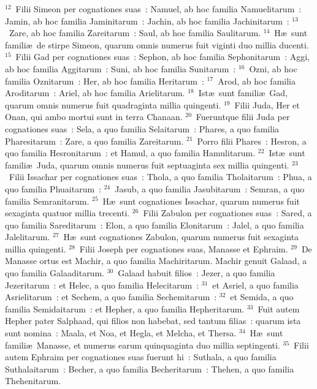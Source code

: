 ${}^{12}$~Filii Simeon per cognationes suas~: Namuel, ab hoc familia Namuelitarum~: Jamin, ab hoc familia Jaminitarum~: Jachin, ab hoc familia Jachinitarum~:
${}^{13}$~Zare, ab hoc familia Zareitarum~: Saul, ab hoc familia Saulitarum.
${}^{14}$~H\ae\ sunt famili\ae\ de stirpe Simeon, quarum omnis numerus fuit viginti duo millia ducenti.
${}^{15}$~Filii Gad per cognationes suas~: Sephon, ab hoc familia Sephonitarum~: Aggi, ab hoc familia Aggitarum~: Suni, ab hoc familia Sunitarum~:
${}^{16}$~Ozni, ab hoc familia Oznitarum~: Her, ab hoc familia Heritarum~:
${}^{17}$~Arod, ab hoc familia Aroditarum~: Ariel, ab hoc familia Arielitarum.
${}^{18}$~Ist\ae\ sunt famili\ae\ Gad, quarum omnis numerus fuit quadraginta millia quingenti.
${}^{19}$~Filii Juda, Her et Onan, qui ambo mortui sunt in terra Chanaan.
${}^{20}$~Fueruntque filii Juda per cognationes suas~: Sela, a quo familia Selaitarum~: Phares, a quo familia Pharesitarum~: Zare, a quo familia Zareitarum.
${}^{21}$~Porro filii Phares~: Hesron, a quo familia Hesronitarum~: et Hamul, a quo familia Hamulitarum.
${}^{22}$~Ist\ae\ sunt famili\ae\ Juda, quarum omnis numerus fuit septuaginta sex millia quingenti.
${}^{23}$~Filii Issachar per cognationes suas~: Thola, a quo familia Tholaitarum~: Phua, a quo familia Phuaitarum~:
${}^{24}$~Jasub, a quo familia Jasubitarum~: Semran, a quo familia Semranitarum.
${}^{25}$~H\ae\ sunt cognationes Issachar, quarum numerus fuit sexaginta quatuor millia trecenti.
${}^{26}$~Filii Zabulon per cognationes suas~: Sared, a quo familia Sareditarum~: Elon, a quo familia Elonitarum~: Jalel, a quo familia Jalelitarum.
${}^{27}$~H\ae\ sunt cognationes Zabulon, quarum numerus fuit sexaginta millia quingenti.
${}^{28}$~Filii Joseph per cognationes suas, Manasse et Ephraim.
${}^{29}$~De Manasse ortus est Machir, a quo familia Machiritarum. Machir genuit Galaad, a quo familia Galaaditarum.
${}^{30}$~Galaad habuit filios~: Jezer, a quo familia Jezeritarum~: et Helec, a quo familia Helecitarum~:
${}^{31}$~et Asriel, a quo familia Asrielitarum~: et Sechem, a quo familia Sechemitarum~:
${}^{32}$~et Semida, a quo familia Semidaitarum~: et Hepher, a quo familia Hepheritarum.
${}^{33}$~Fuit autem Hepher pater Salphaad, qui filios non habebat, sed tantum filias~: quarum ista sunt nomina~: Maala, et Noa, et Hegla, et Melcha, et Thersa.
${}^{34}$~H\ae\ sunt famili\ae\ Manasse, et numerus earum quinquaginta duo millia septingenti.
${}^{35}$~Filii autem Ephraim per cognationes suas fuerunt hi~: Suthala, a quo familia Suthalaitarum~: Becher, a quo familia Becheritarum~: Thehen, a quo familia Thehenitarum.
